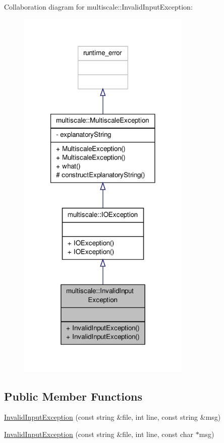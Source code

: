 Collaboration diagram for multiscale\-:\-:Invalid\-Input\-Exception\-:\nopagebreak
\begin{figure}[H]
\begin{center}
\leavevmode
\includegraphics[width=234pt]{classmultiscale_1_1InvalidInputException__coll__graph}
\end{center}
\end{figure}
\subsection*{Public Member Functions}
\begin{DoxyCompactItemize}
\item 
\hyperlink{classmultiscale_1_1InvalidInputException_aea7260856bd45bd4443d7626de243b72}{Invalid\-Input\-Exception} (const string \&file, int line, const string \&msg)
\item 
\hyperlink{classmultiscale_1_1InvalidInputException_af12fa935cdc2aacbba5ea8cda0ef8df1}{Invalid\-Input\-Exception} (const string \&file, int line, const char $\ast$msg)
\end{DoxyCompactItemize}
